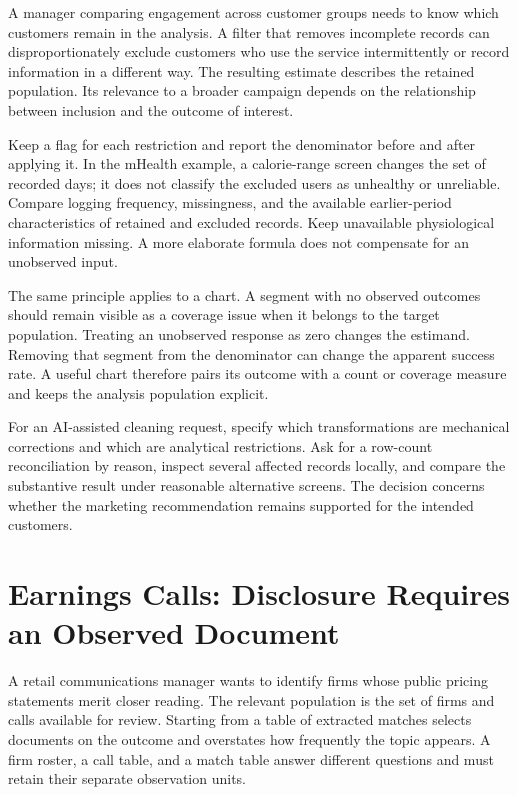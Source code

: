 \noindent \noindent A manager comparing engagement across customer groups needs to
know which customers remain in the analysis. A filter that removes
incomplete records can disproportionately exclude customers who use the
service intermittently or record information in a different way. The
resulting estimate describes the retained population. Its relevance to a
broader campaign depends on the relationship between inclusion and the
outcome of interest.

Keep a flag for each restriction and report the denominator before and
after applying it. In the mHealth example, a calorie-range screen
changes the set of recorded days; it does not classify the excluded
users as unhealthy or unreliable. Compare logging frequency,
missingness, and the available earlier-period characteristics of
retained and excluded records. Keep unavailable physiological
information missing. A more elaborate formula does not compensate for an
unobserved input.

The same principle applies to a chart. A segment with no observed
outcomes should remain visible as a coverage issue when it belongs to
the target population. Treating an unobserved response as zero changes
the estimand. Removing that segment from the denominator can change the
apparent success rate. A useful chart therefore pairs its outcome with a
count or coverage measure and keeps the analysis population explicit.

For an AI-assisted cleaning request, specify which transformations are
mechanical corrections and which are analytical restrictions. Ask for a
row-count reconciliation by reason, inspect several affected records
locally, and compare the substantive result under reasonable alternative
screens. The decision concerns whether the marketing recommendation
remains supported for the intended customers.

\hypertarget{M02-earnings-calls-disclosure-requires-an-observed-document}{%
\section{Earnings Calls: Disclosure Requires an Observed
Document}\label{M02-earnings-calls-disclosure-requires-an-observed-document}}

\noindent \noindent A retail communications manager wants to identify firms whose
public pricing statements merit closer reading. The relevant population
is the set of firms and calls available for review. Starting from a
table of extracted matches selects documents on the outcome and
overstates how frequently the topic appears. A firm roster, a call
table, and a match table answer different questions and must retain
their separate observation units.

